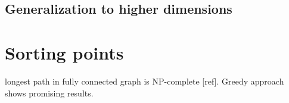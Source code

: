 \subsection{Generalization to higher dimensions}
\label{sec:gener-high-dimens}

\section{Sorting points}
\label{sec:sorting-points}

longest path in fully connected graph is NP-complete [ref]. Greedy approach
shows promising results.

\chapterbreak{}


